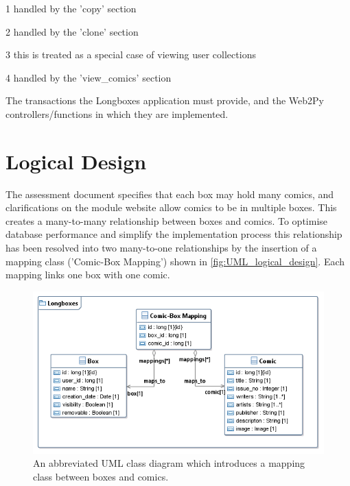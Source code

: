 \documentclass{scrreprt}
\begin{document}
\begin{table}[h]
\begin{threeparttable}
		\begin{tablenotes}
			\item[1] handled by the 'copy' section
			\item[2] handled by the 'clone' section
			\item[3] this is treated as a special case of viewing user collections
			\item[4] handled by the 'view\_comics' section
		\end{tablenotes}
		
		\caption{The transactions the Longboxes application must provide, and the Web2Py controllers/functions in which they are implemented.}
		\label{tab:transaction_map}
	\end{threeparttable}
\end{table}
\clearpage


\section{Logical Design}

The assessment document specifies that each box may hold many comics, and clarifications on the module website allow comics to be in multiple boxes. This creates a many-to-many relationship between boxes and comics. To optimise database performance and simplify the implementation process this relationship has been resolved into two many-to-one relationships by the insertion of a mapping class ('Comic-Box Mapping') shown in \autoref{fig:UML_logical_design}. Each mapping links one box with one comic.

\begin{figure}[h]
	\begin{center}
		\includegraphics{UML_logical_design}
	\end{center}
	\caption{An abbreviated UML class diagram which introduces a mapping class between boxes and comics.}
	\label{fig:UML_logical_design}
\end{figure}
\end{document}
